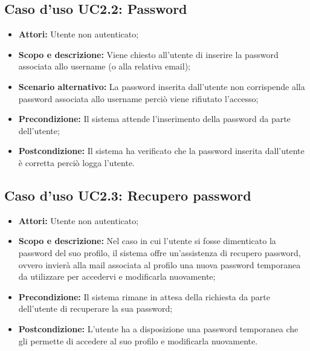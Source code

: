 \documentclass[12pt,a4paper,titlepage]{article}
\begin{document}
\subsection{Caso d'uso UC2.2: Password}
\begin{itemize}
	\item \textbf{Attori: }Utente non autenticato;
	\item \textbf{Scopo e descrizione: }Viene chiesto all'utente di inserire la password associata allo username (o alla relativa email);
	\item \textbf{Scenario alternativo: }La password inserita dall'utente non corrispende alla password associata allo username perciò viene rifiutato l'accesso;
	\item \textbf{Precondizione: }Il sistema attende l'inserimento della password da parte dell'utente;
	\item \textbf{Postcondizione: }Il sistema ha verificato che la password inserita dall'utente è corretta perciò logga l'utente.
\end{itemize}
\subsection{Caso d'uso UC2.3: Recupero password}
\begin{itemize}
	\item \textbf{Attori: }Utente non autenticato;
	\item \textbf{Scopo e descrizione: }Nel caso in cui l'utente si fosse dimenticato la password del suo profilo, il sistema offre un'assistenza di recupero password, ovvero invierà alla mail associata al profilo una nuova password temporanea da utilizzare per accedervi e modificarla nuovamente;
	\item \textbf{Precondizione: }Il sistema rimane in attesa della richiesta da parte dell'utente di recuperare la sua password;
	\item \textbf{Postcondizione: }L'utente ha a disposizione una password temporanea che gli permette di accedere al suo profilo e modificarla nuovamente.
\end{itemize}
\end{document}
